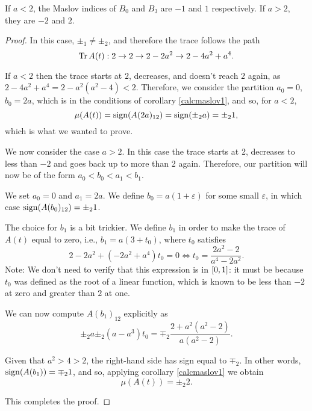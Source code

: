 \begin{prop}
If $a < 2$, the Maslov indices of $B_0$ and $B_3$ are $-1$ and $1$ respectively. If $a > 2$, they are $-2$ and $2$.
\end{prop}

\begin{proof}
In this case, $\pm_1 \neq \pm_2$, and therefore the trace follows the path
\begin{equation}
\operatorname{Tr} A(t) : 2 \to 2 \to 2 - 2a^2 \to 2 - 4a^2 + a^4.
\end{equation}

If $a<2$ then the trace starts at $2$, decreases, and doesn't reach $2$ again, as $2 - 4a^2 + a^4 = 2 - a^2 (a^2 - 4) < 2$. Therefore, we consider the partition $a_0 = 0$, $b_0 = 2a$, which is in the conditions of corollary \ref{calcmaslov1}, and so, for $a<2$,
\begin{equation}
\mu(A(t)) = \operatorname{sign}(A(2a)_{12}) = \operatorname{sign}(\pm_2 a) = \pm_2 1,
\end{equation}
which is what we wanted to prove.

\smallskip

We now consider the case $a > 2$. In this case the trace starts at 2, decreases to less than $-2$ and goes back up to more than 2 again. Therefore, our partition will now be of the form $a_0 < b_0 < a_1 < b_1$.

We set $a_0 = 0$ and $a_1 = 2a$. We define $b_0 = a(1+\varepsilon)$ for some small $\varepsilon$, in which case $\operatorname{sign}(A(b_0)_{12}) = \pm_2 1$.

The choice for $b_1$ is a bit trickier. We define $b_1$ in order to make the trace of $A(t)$ equal to zero, i.e., $b_1 = a(3 + t_0)$, where $t_0$ satisfies
\begin{equation}
2 - 2a^2 + (-2a^2 + a^4)t_0 = 0 \iff t_0 = \frac{2a^2 - 2}{a^4 - 2a^2}.
\end{equation}
Note: We don't need to verify that this expression is in $\interval 0 1$: it must be because $t_0$ was defined as the root of a linear function, which is known to be less than $-2$ at zero and greater than $2$ at one.

We can now compute $A(b_1)_{12}$ explicitly as
\begin{equation}
\pm_2 a \pm_2 (a - a^3) t_0 = \mp_2 \frac{2 + a^2(a^2 - 2)}{a(a^2 - 2)}.
\end{equation}

Given that $a^2 > 4 > 2$, the right-hand side has sign equal to $\mp_2$. In other words, $\operatorname{sign}(A(b_1)) = \mp_2 1$, and so, applying corollary \ref{calcmaslov1} we obtain
\begin{equation}
\mu(A(t)) = \pm_2 2.
\end{equation}

This completes the proof.
\end{proof}